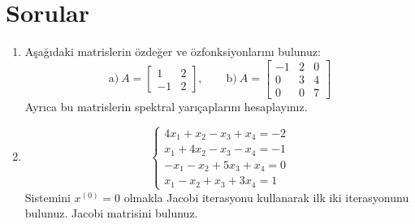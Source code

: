 \documentclass[11pt,a4paper]{article}
\begin{document}
\section{Sorular}
\begin{enumerate}[label=\arabic*)]
  \item Aşağıdaki matrislerin özdeğer ve özfonksiyonlarını bulunuz:
  \[
    \text{a)}\ A=\begin{bmatrix}1&2\\-1&2\end{bmatrix},\qquad
    \text{b)}\ A=\begin{bmatrix}-1&2&0\\0&3&4\\0&0&7\end{bmatrix}
  \]
  Ayrıca bu matrislerin spektral yarıçaplarını hesaplayınız.
  \item
  \[
    \begin{cases}
      4x_1+x_2-x_3+x_4=-2\\
      x_1+4x_2-x_3-x_4=-1\\
      -x_1-x_2+5x_3+x_4=0\\
      x_1-x_2+x_3+3x_4=1
    \end{cases}
  \]
  Sistemini $x^{(0)}=0$ olmakla Jacobi iterasyonu kullanarak ilk iki iterasyonunu bulunuz. Jacobi matrisini bulunuz.
\end{enumerate}
\end{document}
